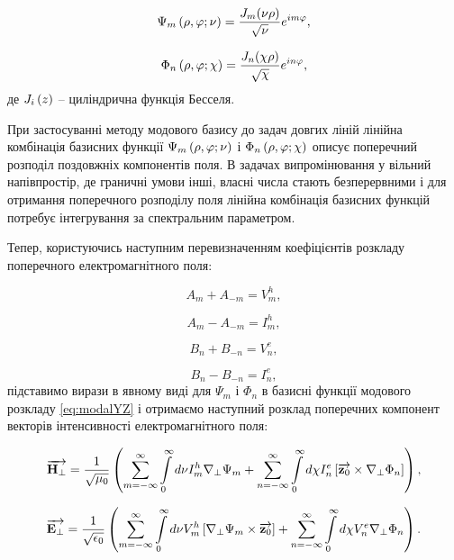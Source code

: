 \begin{equation}
\Psi_m \left( \rho, \varphi; \nu \right) = 
\frac{J_m (\nu \rho)}{\sqrt{\nu}} e^{im\varphi},
\end{equation}

\begin{equation}
\Phi_n \left( \rho, \varphi; \chi \right) = 
\frac{J_n (\chi \rho)}{\sqrt{\chi}} e^{in\varphi},
\end{equation}
%
де $ J_i \left( z \right) $ -- циліндрична функція Бесселя. 

При застосуванні методу модового базису до задач довгих ліній  лінійна 
комбінація базисних функції $ \Psi_m \left( \rho, \varphi; \nu \right) $ і
$ \Phi_n \left( \rho, \varphi; \chi \right) $ описує поперечний розподіл 
поздовжніх компонентів поля. В задачах випромінювання у вільний 
напівпростір, де граничні умови інші, власні числа стають 
безперервними і для отримання поперечного розподілу поля лінійна 
комбінація базисних функцій потребує інтегрування за спектральним 
параметром.

Тепер, користуючись наступним перевизначенням коефіцієнтів розкладу 
поперечного електромагнітного поля:

\begin{equation}
A_m + A_{-m} = V_m^h,
\end{equation}

\begin{equation}
A_m - A_{-m} = I_m^h,
\end{equation}

\begin{equation}
B_n + B_{-n} = V_n^e,
\end{equation}

\begin{equation}
B_n - B_{-n} = I_n^e,
\end{equation}
%
підставимо вирази в явному виді для $ \Psi_m $ і $ \Phi_n $ в базисні функції 
модового розкладу \eqref{eq:modalYZ} і отримаємо наступний розклад поперечних 
компонент векторів інтенсивності електромагнітного поля:

\begin{equation}
\overrightarrow{\mathbf H_\perp} = \frac{1}{\sqrt{\mu_0}} \left( 
\sum \limits_{m=-\infty}^{\infty} \int \limits_{0}^{\infty} d \nu
I_m^h \nabla_\perp \Psi_m + \sum \limits_{n=-\infty}^{\infty}
\int \limits_{0}^{\infty} d \chi I_n^e 
\left[ \overrightarrow{\mathbf z_0} \times \nabla_\perp \Phi_n \right] \right),
\end{equation}

\begin{equation} 
\overrightarrow{\mathbf E_\perp} = \frac{1}{\sqrt{\epsilon_0}} \left( 
\sum \limits_{m=-\infty}^{\infty} \int \limits_{0}^{\infty} 
d \nu V_m^h \left[  \nabla_\perp \Psi_m  \times  \overrightarrow{\mathbf z_0}  \right] +
\sum \limits_{n=-\infty}^{\infty} \int \limits_{0}^{\infty}
d \chi V_n^e \nabla_\perp \Phi_n \right).
\end{equation}

